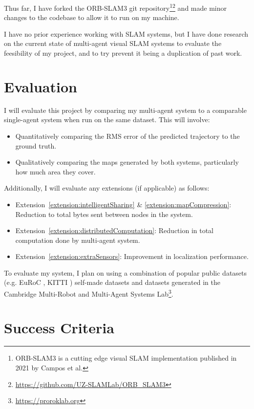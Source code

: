 \documentclass[12pt,a4paper,twoside]{article}
\begin{document}
Thus far, I have forked the ORB-SLAM3 git repository\footnote{ORB-SLAM3 is a cutting edge visual SLAM implementation published in 2021 by Campos et al.}\footnote{\url{https://github.com/UZ-SLAMLab/ORB_SLAM3}} \cite{ORBSLAM3_TRO} and made minor changes to the codebase to allow it to run on my machine.

I have no prior experience working with SLAM systems, but I have done research on the current state of multi-agent visual SLAM systems to evaluate the feesibility of my project, and to try prevent it being a duplication of past work.

\section{Evaluation}
\label{sec:Evaluation}
I will evaluate this project by comparing my multi-agent system to a comparable single-agent system when run on the same dataset. This will involve:
\begin{itemize}
    \item Quantitatively comparing the RMS error of the predicted trajectory to the ground truth.
    \item Qualitatively comparing the maps generated by both systems, particularly how much area they cover.
\end{itemize}

Additionally, I will evaluate any extensions (if applicable) as follows:
\begin{itemize}
    \item Extension~\ref{extension:intelligentSharing} \& \ref{extension:mapCompression}: Reduction to total bytes sent between nodes in the system.
    \item Extension~\ref{extension:distributedComputation}: Reduction in total computation done by multi-agent system.
    \item Extension~\ref{extension:extraSensors}: Improvement in localization performance.
\end{itemize}

To evaluate my system, I plan on using a combination of popular public datasets (e.g. EuRoC \autocite{doi:10.1177/0278364915620033}, KITTI \autocite{doi:10.1177/0278364913491297}) self-made datasets and datasets generated in the Cambridge Multi-Robot and Multi-Agent Systems Lab\footnote{\url{https://proroklab.org}}.

\section{Success Criteria}
\end{document}
